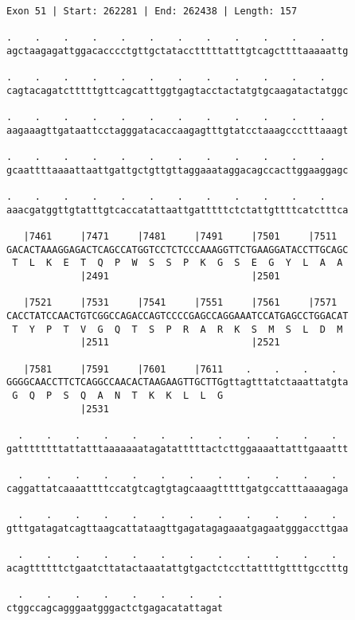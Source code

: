 \documentclass{article}
\begin{document}
\begin{Verbatim}
Exon 51 | Start: 262281 | End: 262438 | Length: 157
 
.    .    .    .    .    .    .    .    .    .    .    .    
agctaagagattggacacccctgttgctatacctttttatttgtcagcttttaaaaattg
  
.    .    .    .    .    .    .    .    .    .    .    .    
cagtacagatctttttgttcagcatttggtgagtacctactatgtgcaagatactatggc
  
.    .    .    .    .    .    .    .    .    .    .    .    
aagaaagttgataattcctagggatacaccaagagtttgtatcctaaagccctttaaagt
  
.    .    .    .    .    .    .    .    .    .    .    .    
gcaattttaaaattaattgattgctgttgttaggaaataggacagccacttggaaggagc
  
.    .    .    .    .    .    .    .    .    .    .    .    
aaacgatggttgtatttgtcaccatattaattgatttttctctattgttttcatctttca
  
   |7461     |7471     |7481     |7491     |7501     |7511  
GACACTAAAGGAGACTCAGCCATGGTCCTCTCCCAAAGGTTCTGAAGGATACCTTGCAGC
 T  L  K  E  T  Q  P  W  S  S  P  K  G  S  E  G  Y  L  A  A 
             |2491                         |2501            
  
   |7521     |7531     |7541     |7551     |7561     |7571  
CACCTATCCAACTGTCGGCCAGACCAGTCCCCGAGCCAGGAAATCCATGAGCCTGGACAT
 T  Y  P  T  V  G  Q  T  S  P  R  A  R  K  S  M  S  L  D  M 
             |2511                         |2521            
  
   |7581     |7591     |7601     |7611    .    .    .    .  
GGGGCAACCTTCTCAGGCCAACACTAAGAAGTTGCTTGgttagtttatctaaattatgta
 G  Q  P  S  Q  A  N  T  K  K  L  L  G                      
             |2531                                          
  
  .    .    .    .    .    .    .    .    .    .    .    .  
gattttttttattatttaaaaaaatagatatttttactcttggaaaattatttgaaattt
  
  .    .    .    .    .    .    .    .    .    .    .    .  
caggattatcaaaattttccatgtcagtgtagcaaagtttttgatgccatttaaaagaga
  
  .    .    .    .    .    .    .    .    .    .    .    .  
gtttgatagatcagttaagcattataagttgagatagagaaatgagaatgggaccttgaa
  
  .    .    .    .    .    .    .    .    .    .    .    .  
acagttttttctgaatcttatactaaatattgtgactctccttattttgttttgcctttg
  
  .    .    .    .    .    .    .    .
ctggccagcagggaatgggactctgagacatattagat
\end{Verbatim}
\end{document}

